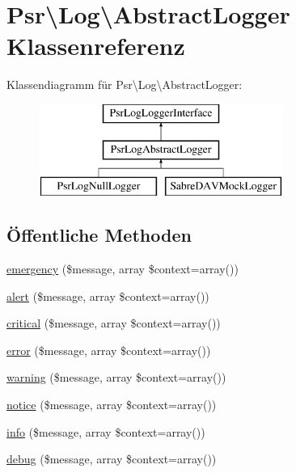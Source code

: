 \hypertarget{class_psr_1_1_log_1_1_abstract_logger}{}\section{Psr\textbackslash{}Log\textbackslash{}Abstract\+Logger Klassenreferenz}
\label{class_psr_1_1_log_1_1_abstract_logger}
Klassendiagramm für Psr\textbackslash{}Log\textbackslash{}Abstract\+Logger\+:\begin{figure}[H]
\begin{center}
\leavevmode
\includegraphics[height=3.000000cm]{class_psr_1_1_log_1_1_abstract_logger}
\end{center}
\end{figure}
\subsection*{Öffentliche Methoden}
\begin{DoxyCompactItemize}
\item 
\mbox{\hyperlink{class_psr_1_1_log_1_1_abstract_logger_a764e674efac84838693871e7cf442d10}{emergency}} (\$message, array \$context=array())
\item 
\mbox{\hyperlink{class_psr_1_1_log_1_1_abstract_logger_a034a4d0f8091c7bd9906a06bb68c6822}{alert}} (\$message, array \$context=array())
\item 
\mbox{\hyperlink{class_psr_1_1_log_1_1_abstract_logger_a0a84f40791f9404160f3a3dee53d85d4}{critical}} (\$message, array \$context=array())
\item 
\mbox{\hyperlink{class_psr_1_1_log_1_1_abstract_logger_a7baa293e10760d6e55f89c54dce7f7eb}{error}} (\$message, array \$context=array())
\item 
\mbox{\hyperlink{class_psr_1_1_log_1_1_abstract_logger_a2152c0a1d5cf25808ee1b3a977f40976}{warning}} (\$message, array \$context=array())
\item 
\mbox{\hyperlink{class_psr_1_1_log_1_1_abstract_logger_aec9b9f7df26b9f4197ea5be59a34c275}{notice}} (\$message, array \$context=array())
\item 
\mbox{\hyperlink{class_psr_1_1_log_1_1_abstract_logger_adc596338d3a71cc3d57805738f521dfe}{info}} (\$message, array \$context=array())
\item 
\mbox{\hyperlink{class_psr_1_1_log_1_1_abstract_logger_a3d870d278e17778035b78f548a9f0ecd}{debug}} (\$message, array \$context=array())
\end{DoxyCompactItemize}


